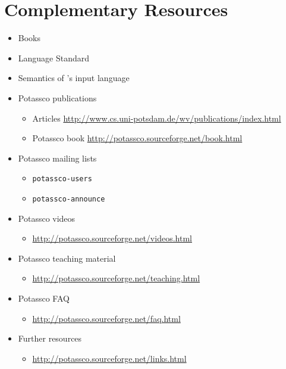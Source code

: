 
\section{Complementary Resources}
\label{sec:resources}
\tbr
\begin{itemize}
\item Books \cite{baral03a,gekakasc12a,gelkah14a}
\item Language Standard \cite{aspcore2}
\item Semantics of \gringo's input language \cite{gehakalisc14a,haliya14a}
\item Potassco publications
  \begin{itemize}
  \item Articles \url{http://www.cs.uni-potsdam.de/wv/publications/index.html}
  \item Potassco book \url{http://potassco.sourceforge.net/book.html}
  \end{itemize}
\item Potassco mailing lists
  \begin{itemize}
  \item \texttt{potassco-users}
  \item \texttt{potassco-announce}
  \end{itemize}
\item Potassco videos
  \begin{itemize}
  \item \url{http://potassco.sourceforge.net/videos.html}
  \end{itemize}
\item Potassco teaching material
  \begin{itemize}
  \item \url{http://potassco.sourceforge.net/teaching.html}
  \end{itemize}
\item Potassco FAQ
  \begin{itemize}
  \item \url{http://potassco.sourceforge.net/faq.html}
  \end{itemize}
\item Further resources
  \begin{itemize}
  \item \url{http://potassco.sourceforge.net/links.html}
  \end{itemize}
\end{itemize}

